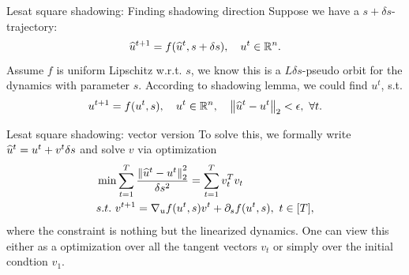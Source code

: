\documentclass{beamer}
\begin{document}
\begin{frame}{Lesat square shadowing: Finding shadowing direction}
	Suppose we have a $s+\delta s$-trajectory:
	\begin{equation}
		\widehat u^{t+1} = f(\widehat u^t, s+\delta s), \quad u^t \in \mathbb{R}^n.
	\end{equation}
	Assume $f$ is uniform Lipschitz w.r.t. $s$, we know this is a $L\delta s$-pseudo orbit for the dynamics
	with parameter $s$. According to shadowing lemma, we could find $u^t$, s.t.
	\begin{equation}
		u^{t+1} = f(u^t, s), \quad u^t \in \mathbb{R}^n, \quad \left\| \widehat u^t - u^t \right\|_2 < \epsilon, \ \forall t.
	\end{equation}
\end{frame}

\begin{frame}{Lesat square shadowing: vector version}
	To solve this, we formally write $\widehat u^t = u^t + v^t \delta s$ and solve $v$ via optimization
	\begin{equation}\label{equ:vector-lss}
		\begin{aligned}
			& \min \sum_{t=1}^T \frac{\left\| \widehat u^t - u^t \right\|_2^2}{\delta s^2} = \sum_{t=1}^T v_t^T v_t \\
			& s.t. \ v^{t+1} = \nabla_u f(u^t, s)v^t + \partial_s f(u^t, s), \ t \in [T],
		\end{aligned}		
	\end{equation}
	where the constraint is nothing but the linearized dynamics. One can view this either as 
	a optimization over all the tangent vectors $v_t$ or simply over the initial condtion $v_1.$
\end{frame}
\end{document}
